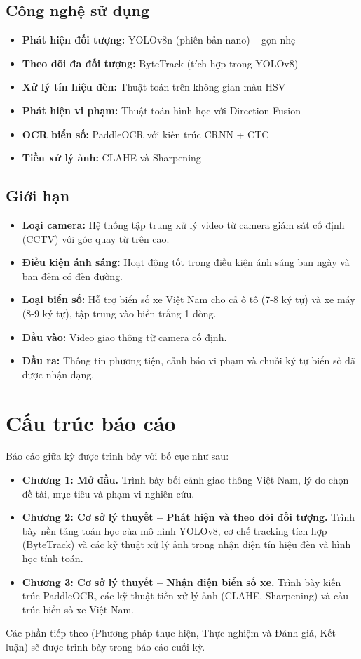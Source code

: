 \subsection{Công nghệ sử dụng}
\begin{itemize}
    \item \textbf{Phát hiện đối tượng:} YOLOv8n (phiên bản nano) -- gọn nhẹ
    \item \textbf{Theo dõi đa đối tượng:} ByteTrack (tích hợp trong YOLOv8)
    \item \textbf{Xử lý tín hiệu đèn:} Thuật toán trên không gian màu HSV
    \item \textbf{Phát hiện vi phạm:} Thuật toán hình học với Direction Fusion
    \item \textbf{OCR biển số:} PaddleOCR với kiến trúc CRNN + CTC
    \item \textbf{Tiền xử lý ảnh:} CLAHE và Sharpening
\end{itemize}

\subsection{Giới hạn}
\begin{itemize}
    \item \textbf{Loại camera:} Hệ thống tập trung xử lý video từ camera giám sát cố định (CCTV) với góc quay từ trên cao.
    \item \textbf{Điều kiện ánh sáng:} Hoạt động tốt trong điều kiện ánh sáng ban ngày và ban đêm có đèn đường.
    \item \textbf{Loại biển số:} Hỗ trợ biển số xe Việt Nam cho cả ô tô (7-8 ký tự) và xe máy (8-9 ký tự), tập trung vào biển trắng 1 dòng.
    \item \textbf{Đầu vào:} Video giao thông từ camera cố định.
    \item \textbf{Đầu ra:} Thông tin phương tiện, cảnh báo vi phạm và chuỗi ký tự biển số đã được nhận dạng.
\end{itemize}

\section{Cấu trúc báo cáo}
Báo cáo giữa kỳ được trình bày với bố cục như sau:
\begin{itemize}
    \item \textbf{Chương 1: Mở đầu.} Trình bày bối cảnh giao thông Việt Nam, lý do chọn đề tài, mục tiêu và phạm vi nghiên cứu.
    
    \item \textbf{Chương 2: Cơ sở lý thuyết -- Phát hiện và theo dõi đối tượng.} Trình bày nền tảng toán học của mô hình YOLOv8, cơ chế tracking tích hợp (ByteTrack) và các kỹ thuật xử lý ảnh trong nhận diện tín hiệu đèn và hình học tính toán.
    
    \item \textbf{Chương 3: Cơ sở lý thuyết -- Nhận diện biển số xe.} Trình bày kiến trúc PaddleOCR, các kỹ thuật tiền xử lý ảnh (CLAHE, Sharpening) và cấu trúc biển số xe Việt Nam.
\end{itemize}

Các phần tiếp theo (Phương pháp thực hiện, Thực nghiệm và Đánh giá, Kết luận) sẽ được trình bày trong báo cáo cuối kỳ.
